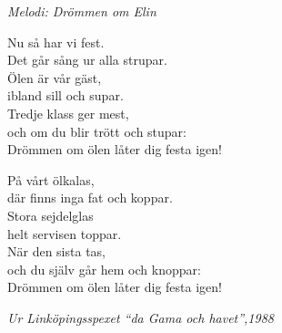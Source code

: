 {\footnotesize\textit{Melodi: Drömmen om Elin}}\par
\vspace{10pt}
Nu så har vi fest.\\
Det går sång ur alla strupar.\\
Ölen är vår gäst,\\
ibland sill och supar.\\
Tredje klass ger mest,\\
och om du blir trött och stupar:\\
Drömmen om ölen låter dig festa igen!\par
\vspace{10pt}
På vårt ölkalas,\\
där finns inga fat och koppar.\\
Stora sejdelglas\\
helt servisen toppar.\\
När den sista tas,\\
och du själv går hem och knoppar:\\
Drömmen om ölen låter dig festa igen!\par
\vspace{10pt}
{\footnotesize\textit{Ur Linköpingsspexet ``da Gama och havet'',1988}}
